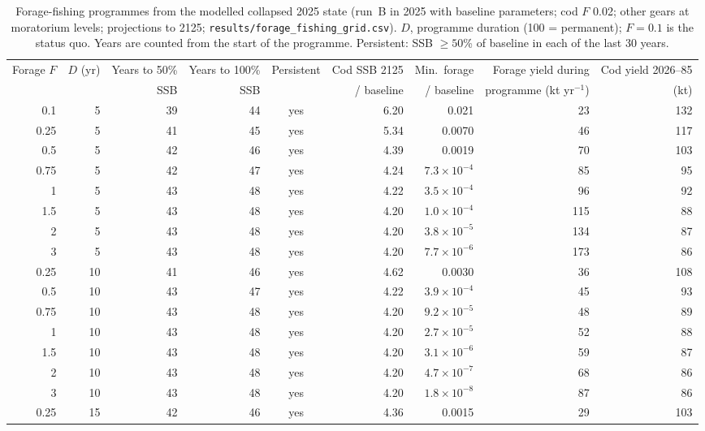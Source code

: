 \documentclass[11pt,letterpaper,fleqn]{article}
\begin{document}
\begin{table}[p]\caption{Forage-fishing programmes from the modelled collapsed 2025 state (run~B in 2025 with baseline parameters; cod $F$ 0.02; other gears at moratorium levels; projections to 2125; \nolinkurl{results/forage_fishing_grid.csv}). $D$, programme duration (100 = permanent); $F=0.1$ is the status quo. Years are counted from the start of the programme. Persistent: SSB $\geq50$\% of baseline in each of the last 30 years.}\label{tab:S-ffgrid}
\centering\scriptsize\begin{adjustbox}{max width=\textwidth}\begin{tabular}{@{}rrrrcrrrr@{}}\toprule
Forage $F$ & $D$ (yr) & Years to 50\% & Years to 100\% & Persistent & Cod SSB 2125 & Min.\ forage & Forage yield during & Cod yield 2026--85\\
 & & SSB & SSB & & / baseline & / baseline & programme (kt yr$^{-1}$) & (kt)\\\midrule
0.1 & 5 & 39 & 44 & yes & 6.20 & 0.021 & 23 & 132\\
0.25 & 5 & 41 & 45 & yes & 5.34 & 0.0070 & 46 & 117\\
0.5 & 5 & 42 & 46 & yes & 4.39 & 0.0019 & 70 & 103\\
0.75 & 5 & 42 & 47 & yes & 4.24 & $7.3\times10^{-4}$ & 85 & 95\\
1 & 5 & 43 & 48 & yes & 4.22 & $3.5\times10^{-4}$ & 96 & 92\\
1.5 & 5 & 43 & 48 & yes & 4.20 & $1.0\times10^{-4}$ & 115 & 88\\
2 & 5 & 43 & 48 & yes & 4.20 & $3.8\times10^{-5}$ & 134 & 87\\
3 & 5 & 43 & 48 & yes & 4.20 & $7.7\times10^{-6}$ & 173 & 86\\
0.25 & 10 & 41 & 46 & yes & 4.62 & 0.0030 & 36 & 108\\
0.5 & 10 & 43 & 47 & yes & 4.22 & $3.9\times10^{-4}$ & 45 & 93\\
0.75 & 10 & 43 & 48 & yes & 4.20 & $9.2\times10^{-5}$ & 48 & 89\\
1 & 10 & 43 & 48 & yes & 4.20 & $2.7\times10^{-5}$ & 52 & 88\\
1.5 & 10 & 43 & 48 & yes & 4.20 & $3.1\times10^{-6}$ & 59 & 87\\
2 & 10 & 43 & 48 & yes & 4.20 & $4.7\times10^{-7}$ & 68 & 86\\
3 & 10 & 43 & 48 & yes & 4.20 & $1.8\times10^{-8}$ & 87 & 86\\
0.25 & 15 & 42 & 46 & yes & 4.36 & 0.0015 & 29 & 103\\

\end{tabular}
\end{adjustbox}
\end{table}
\end{document}
